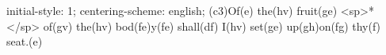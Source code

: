 initial-style: 1;
centering-scheme: english;
(c3)Of(e) the(hv) fruit(ge) <sp>*</sp> of(gv) the(hv) bod(fe)y(fe) shall(df) I(hv) set(ge) up(gh)on(fg) thy(f) seat.(e)